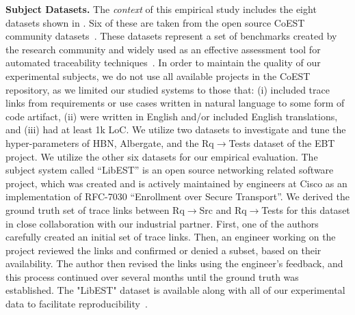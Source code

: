 \textbf{Subject Datasets.} The \textit{context} of this empirical study includes the eight datasets shown in . Six of these are taken from the open source CoEST community datasets~\cite{coest-datasets}. These datasets represent a set of benchmarks created by the research community and widely used as an effective assessment tool for automated traceability techniques~\citep{Antoniol:e,Cleland-Huang:TSE'03,Poshyvanyk:TEFSE'11,Gethers:ICSM'11}. In order to maintain the quality of our experimental subjects, we do not use all available projects in the CoEST repository, as we limited our studied systems to those that: (i) included trace links from requirements or use cases written in natural language to some form of code artifact, (ii) were written in English and/or included English translations, and (iii) had at least 1k LoC.  We utilize two datasets to investigate and tune the hyper-parameters of \Comets HBN, Albergate, and the Rq$\rightarrow$Tests dataset of the EBT project. We utilize the other six datasets for our empirical evaluation. The subject system called ``LibEST'' is an open source networking related software project, which was created and is actively maintained by engineers at Cisco as an implementation of RFC-7030 ``Enrollment over Secure Transport''. We derived the ground truth set of trace links between Rq$\rightarrow$Src and Rq$\rightarrow$Tests for this dataset in close collaboration with our industrial partner. First, one of the authors carefully created an initial set of trace links. Then, an engineer working on the project reviewed the links and confirmed or denied a subset, based on their availability. The author then revised the links using the engineer's feedback, and this process continued over several months until the ground truth was established. The "LibEST" dataset is available along with all of our experimental data to facilitate reproducibility~\citep{appendix}.


